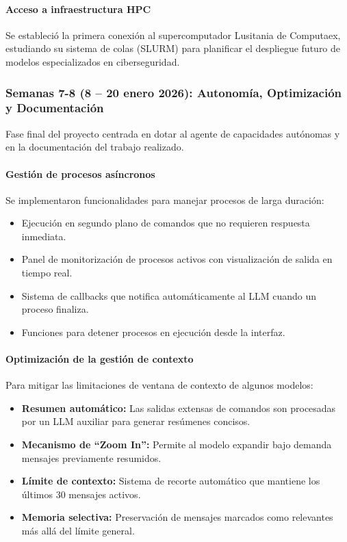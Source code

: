 \documentclass[12pt,a4paper]{article}
\begin{document}
\paragraph{Acceso a infraestructura HPC}

Se estableció la primera conexión al supercomputador Lusitania de Computaex, estudiando su sistema de colas (SLURM) para planificar el despliegue futuro de modelos especializados en ciberseguridad.

\subsubsection{Semanas 7-8 (8 -- 20 enero 2026): Autonomía, Optimización y Documentación}

Fase final del proyecto centrada en dotar al agente de capacidades autónomas y en la documentación del trabajo realizado.

\paragraph{Gestión de procesos asíncronos}

Se implementaron funcionalidades para manejar procesos de larga duración:

\begin{itemize}
    \item Ejecución en segundo plano de comandos que no requieren respuesta inmediata.
    \item Panel de monitorización de procesos activos con visualización de salida en tiempo real.
    \item Sistema de callbacks que notifica automáticamente al LLM cuando un proceso finaliza.
    \item Funciones para detener procesos en ejecución desde la interfaz.
\end{itemize}

\paragraph{Optimización de la gestión de contexto}

Para mitigar las limitaciones de ventana de contexto de algunos modelos:

\begin{itemize}
    \item \textbf{Resumen automático:} Las salidas extensas de comandos son procesadas por un LLM auxiliar para generar resúmenes concisos.
    \item \textbf{Mecanismo de ``Zoom In'':} Permite al modelo expandir bajo demanda mensajes previamente resumidos.
    \item \textbf{Límite de contexto:} Sistema de recorte automático que mantiene los últimos 30 mensajes activos.
    \item \textbf{Memoria selectiva:} Preservación de mensajes marcados como relevantes más allá del límite general.
\end{itemize}
\end{document}
